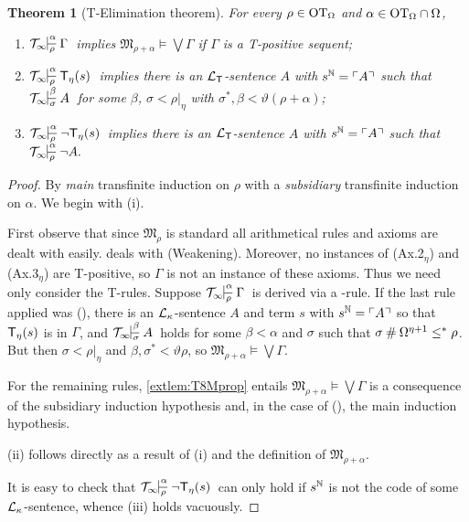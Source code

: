 \documentclass[UKenglish,cleveref,DIV=12]{scrartcl}
\newtheorem{theorem}{Theorem}
\theoremstyle{definition}
\theoremstyle{definition}
\begin{document}
\begin{theorem}[T-Elimination theorem]\label{extlem:T8model}\label{extlem:T8TElim}
For every $\rho\in\mathrm{OT}_\Omega$ and $\alpha\in\mathrm{OT}_\Omega\cap\Omega$,
\begin{enumerate}
 \item $\Tinfty\prov\alpha\rho\Gamma$ implies $\mathfrak
	M_{\rho+\alpha}\models\bigvee\Gamma$  if $\Gamma$ is a T-positive sequent;
 \item $\Tinfty\prov\alpha\rho{\T_\eta(s)}$ implies there is an $\mathcal{L}_{\mathsf{T}}$-sentence $A$ with $s^\mathbb N=\ulcorner{A}\urcorner$ such that $\Tinfty\prov\beta\sigma A$ for some $\beta$, $\sigma<\rho|_\eta$ with $\sigma^*,\beta<\vartheta(\rho+\alpha)$;
  \item $\Tinfty\prov\alpha\rho{\lnot \T_\eta(s)}$ implies there is an $\mathcal{L}_{\mathsf{T}}$-sentence $A$ with $s^\mathbb N=\ulcorner{A}\urcorner$ such that $\Tinfty\prov\alpha\rho {\lnot A.}$
\end{enumerate}
\end{theorem}
\begin{proof} By {\em main} transfinite induction on $\rho$ with a {\em subsidiary} transfinite induction on $\alpha$. We begin with (i).

First observe that since $\mathfrak M_\rho$ is standard all
arithmetical rules and axioms are dealt with easily.  deals
with (Weakening). Moreover, no instances of (Ax.2$_\eta$) and
(Ax.3$_\eta$) are T-positive, so $\Gamma$ is not an instance of these axioms. Thus
we need only consider the T-rules. Suppose $\Tinfty\prov\alpha\rho\Gamma$
is derived via a \textT\eta-rule. If the last rule applied was
(\Nec\eta), there is an $\mathcal{L}_\kappa$-sentence $A$ and term $s$ with
$s^\mathbb N=\ulcorner{A}\urcorner$ so that $\mathsf{T}_\eta(s)$ is in $\Gamma$, and $\Tinfty\prov\beta\sigma A$
holds for some $\beta<\alpha$ and $\sigma$ such that
$\sigma\mathbin{\#}\Omega^{\eta+1}\le^*\rho$. But then $\sigma<\rho|_\eta$ and $\beta,\sigma^*<\vartheta\rho$, so $\mathfrak{M}_{\rho+\alpha}\models\bigvee\Gamma$.

For the remaining rules, \cref{extlem:T8Mprop} entails $\mathfrak M_{\rho+\alpha}\models\bigvee\Gamma$ is a consequence of the subsidiary induction hypothesis and, in the case of (\Del\eta), the main induction hypothesis.

(ii) follows directly as a result of (i) and the definition of $\mathfrak M_{\rho+\alpha}$.

It is easy to check that $\Tinfty\prov\alpha\rho{\lnot \T_\eta(s)}$ can only hold
if $s^\mathbb N$ is not the code of some $\mathcal{L}_\kappa$-sentence, whence (iii) holds
vacuously.
\end{proof}
\end{document}
